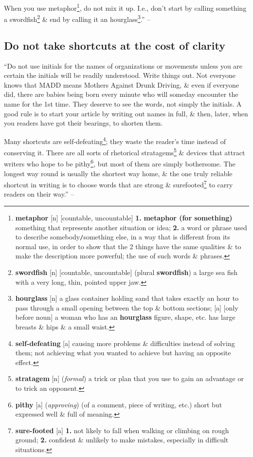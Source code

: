 \documentclass[oneside]{book}
\numberwithin{equation}{section}
\begin{document}
When you use metaphor\footnote{\textbf{metaphor} [n] [countable, uncountable] \textbf{1.} \textbf{metaphor (for something)} something that represents another situation or idea; \textbf{2.} a word or phrase used to describe somebody\texttt{/}something else, in a way that is different from its normal use, in order to show that the 2 things have the same qualities \& to make the description more powerful; the use of such words \& phrases.}, do not mix it up. I.e., don't start by calling something a swordfish\footnote{\textbf{swordfish} [n] [countable, uncountable] (plural \textbf{swordfish}) a large sea fish with a very long, thin, pointed upper jaw.} \& end by calling it an hourglass\footnote{\textbf{hourglass} [n] a glass container holding sand that takes exactly an hour to pass through a small opening between the top \& bottom sections; [a] [only before noun] a woman who has an \textbf{hourglass} figure, shape, etc. has large breasts \& hips \& a small waist.}.'' -- \cite[Chap. 5, Sect. 18, p. 97]{Strunk_White2019}

\subsection{Do not take shortcuts at the cost of clarity}
``Do not use initials for the names of organizations or movements unless you are certain the initials will be readily understood. Write things out. Not everyone knows that MADD means Mothers Against Drunk Driving, \& even if everyone did, there are babies being born every minute who will someday encounter the name for the 1st time. They deserve to see the words, not simply the initials. A good rule is to start your article by writing out names in full, \& then, later, when you readers have got their bearings, to shorten them.

Many shortcuts are self-defeating\footnote{\textbf{self-defeating} [a] causing more problems \& difficulties instead of solving them; not achieving what you wanted to achieve but having an opposite effect.}; they waste the reader's time instead of conserving it. There are all sorts of rhetorical stratagems\footnote{\textbf{stratagem} [n] (\textit{formal}) a trick or plan that you use to gain an advantage or to trick an opponent.} \& devices that attract writers who hope to be pithy\footnote{\textbf{pithy} [a] (\textit{approving}) (of a comment, piece of writing, etc.) short but expressed well \& full of meaning.}, but most of them are simply bothersome. The longest way round is usually the shortest way home, \& the one truly reliable shortcut in writing is to choose words that are strong \& surefooted\footnote{\textbf{sure-footed} [a] \textbf{1.} not likely to fall when walking or climbing on rough ground; \textbf{2.} confident \& unlikely to make mistakes, especially in difficult situations.} to carry readers on their way.'' -- \cite[Chap. 5, Sect. 19, p. 98]{Strunk_White2019}
\end{document}
